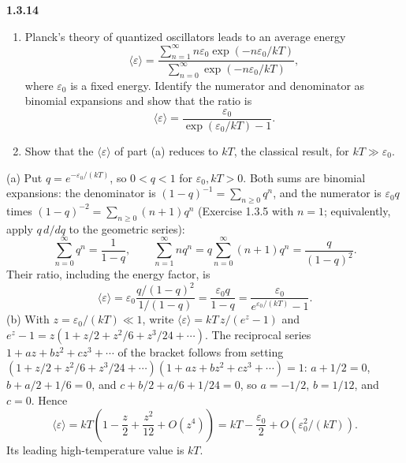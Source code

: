 \par\bigskip
\noindent\textbf{1.3.14}\quad
\begin{enumerate}
\item[(a)] Planck's theory of quantized oscillators leads to an average energy
  \[
  \langle\varepsilon\rangle=
  \frac{\displaystyle\sum_{n=1}^{\infty}n\varepsilon_{0}
  \exp(-n\varepsilon_{0}/kT)}
  {\displaystyle\sum_{n=0}^{\infty}\exp(-n\varepsilon_{0}/kT)},
  \]
  where $\varepsilon_{0}$ is a fixed energy. Identify the numerator and
  denominator as binomial expansions and show that the ratio is
  \[
  \langle\varepsilon\rangle=\frac{\varepsilon_{0}}
  {\exp(\varepsilon_{0}/kT)-1}.
  \]
\item[(b)] Show that the $\langle\varepsilon\rangle$ of part (a) reduces to
  $kT$, the classical result, for $kT\gg\varepsilon_{0}$.
\end{enumerate}
\solution
(a) Put $q=e^{-\varepsilon_0/(kT)}$, so $0<q<1$ for
$\varepsilon_0,kT>0$. Both sums are binomial expansions: the
denominator is $(1-q)^{-1}=\sum_{n\ge0}q^n$, and the numerator is
$\varepsilon_0q$ times $(1-q)^{-2}=\sum_{n\ge0}(n+1)q^n$ (Exercise 1.3.5
with $n=1$; equivalently, apply $q\,d/dq$ to the geometric series):
\[
 \sum_{n=0}^\infty q^n=\frac1{1-q},\qquad
 \sum_{n=1}^\infty n q^n=q\sum_{n=0}^\infty(n+1)q^n
                         =\frac q{(1-q)^2}.
\]
Their ratio, including the energy factor, is
\[
 \langle\varepsilon\rangle=\varepsilon_0
 \frac{q/(1-q)^2}{1/(1-q)}
 =\frac{\varepsilon_0 q}{1-q}
 =\frac{\varepsilon_0}{e^{\varepsilon_0/(kT)}-1}.
\]
(b) With $z=\varepsilon_0/(kT)\ll1$, write
$\langle\varepsilon\rangle=kT\,z/(e^z-1)$ and
$e^z-1=z(1+z/2+z^2/6+z^3/24+\cdots)$. The reciprocal series
$1+az+bz^2+cz^3+\cdots$ of the bracket follows from setting
$(1+z/2+z^2/6+z^3/24+\cdots)(1+az+bz^2+cz^3+\cdots)=1$:
$a+1/2=0$, $b+a/2+1/6=0$, and $c+b/2+a/6+1/24=0$, so $a=-1/2$,
$b=1/12$, and $c=0$. Hence
\[
 \langle\varepsilon\rangle
 =kT\left(1-\frac z2+\frac{z^2}{12}+O(z^4)\right)
 =kT-\frac{\varepsilon_0}{2}+O(\varepsilon_0^2/(kT)).
\]
Its leading high-temperature value is $kT$.


